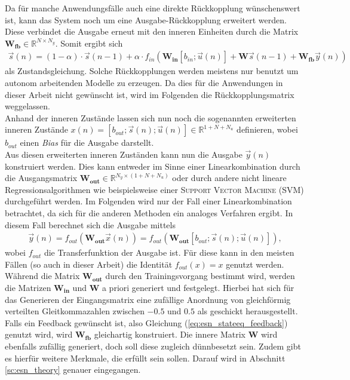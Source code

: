 Da für manche Anwendungsfälle auch eine direkte Rückkopplung wünschenswert ist, kann das System noch um eine Ausgabe-Rückkopplung erweitert werden. Diese verbindet die Ausgabe erneut mit den inneren Einheiten durch die Matrix $\mathbf{W_{fb}} \in \mathbb{R}^{N \times N_y}$.
Somit ergibt sich 
\begin{align}
\label{eq:esn_stateeq_feedback}
\vec{s}(n) = (1 - \alpha) \cdot \vec{s}(n-1) + \alpha \cdot f_{in}\left( \mathbf{W_{in}} [b_{in}; \vec{u}(n)] + \mathbf{W} \vec{s}(n-1) + \mathbf{W_{fb}} \vec{y}(n) \right)
\end{align}
als Zustandsgleichung. Solche Rückkopplungen werden meistens nur benutzt um autonom arbeitenden Modelle zu erzeugen. Da dies für die Anwendungen in dieser Arbeit nicht gewünscht ist, wird im Folgenden die Rückkopplungsmatrix weggelassen.\\

Anhand der inneren Zustände lassen sich nun noch die sogenannten erweiterten inneren Zustände $x(n) = [b_{out}; \vec{s}(n); \vec{u}(n)] \in \mathbb{R}^{1 + N + N_u}$ definieren, wobei $b_{out}$ einen \textit{Bias} für die Ausgabe darstellt.\\

Aus diesen erweiterten inneren Zuständen kann nun die Ausgabe $\vec{y}(n)$ konstruiert werden. Dies kann entweder im Sinne einer Linearkombination durch die Ausgangsmatrix $\mathbf{W_{out}} \in \mathbb{R}^{ N_y \times (1 + N + N_u)}$ oder durch andere nicht lineare Regressionsalgorithmen wie beispielsweise einer \textsc{Support Vector Machine (SVM)} durchgeführt werden. Im Folgenden wird nur der Fall einer Linearkombination betrachtet, da sich für die anderen Methoden ein analoges Verfahren ergibt.
In diesem Fall berechnet sich die Ausgabe mittels
\begin{align}
\vec{y}(n) = f_{out} \left( \mathbf{W_{out}} \vec{x}(n) \right) = f_{out} \left(\mathbf{W_{out}} [b_{out}; \vec{s}(n); \vec{u}(n)] \right),
\end{align}
wobei $f_{out}$ die Transferfunktion der Ausgabe ist. Für diese kann in den meisten Fällen (so auch in dieser Arbeit) die Identität $f_{out}(x) = x$ genutzt werden.\\

Während die Matrix $\mathbf{W_{out}}$ durch den Trainingsvorgang bestimmt wird, werden die Matrizen $\mathbf{W_{in}}$ und $\mathbf{W}$ a priori generiert und festgelegt. Hierbei hat sich für das Generieren der Eingangsmatrix eine zufällige Anordnung von gleichförmig verteilten Gleitkommazahlen zwischen $-0.5$ und $0.5$ als geschickt herausgestellt. Falls ein Feedback gewünscht ist, also Gleichung (\ref{eq:esn_stateeq_feedback}) genutzt wird, wird $\mathbf{W_{fb}}$ gleichartig konstruiert. Die innere Matrix $\mathbf{W}$ wird ebenfalls zufällig generiert, doch soll diese zugleich dünnbesetzt sein. Zudem gibt es hierfür weitere Merkmale, die erfüllt sein sollen. Darauf wird in Abschnitt \ref{sc:esn_theory} genauer eingegangen.

